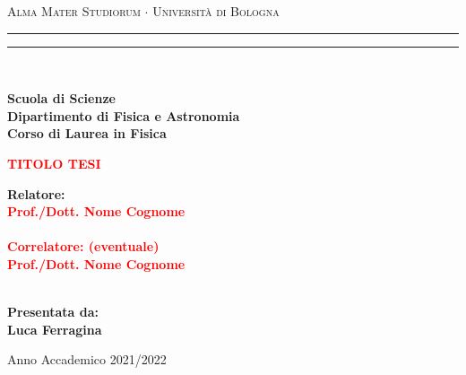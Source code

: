 \documentclass[12pt,a4paper]{report}
\begin{document}
\begin{titlepage}
\begin{center}
{{\Large{\textsc{Alma Mater Studiorum $\cdot$ Universit\`a di Bologna}}}} 
\rule[0.1cm]{15.8cm}{0.1mm}
\rule[0.5cm]{15.8cm}{0.6mm}
\\\vspace{3mm}

{\small{\bf Scuola di Scienze \\ 
Dipartimento di Fisica e Astronomia\\
Corso di Laurea in Fisica}}

\end{center}

\vspace{23mm}

\begin{center}\textcolor{red}{
%
%
{\LARGE{\bf TITOLO TESI}}\\
}\end{center}

\vspace{50mm} \par \noindent

\begin{minipage}[t]{0.47\textwidth}
%
%
{\large{\bf Relatore: \vspace{2mm}\\\textcolor{red}{
Prof./Dott. Nome Cognome}\\\\
%
%
%
\textcolor{red}{
\bf Correlatore: (eventuale)
\vspace{2mm}\\
Prof./Dott. Nome Cognome\\\\}}}
\end{minipage}
%
\hfill
%
\begin{minipage}[t]{0.47\textwidth}\raggedleft
{\large{\bf Presentata da:
\vspace{2mm}\\
Luca Ferragina}}
\end{minipage}

\vspace{40mm}

\begin{center}
%
%
Anno Accademico 2021/2022
\end{center}

\end{titlepage}

\tableofcontents
\end{document}
